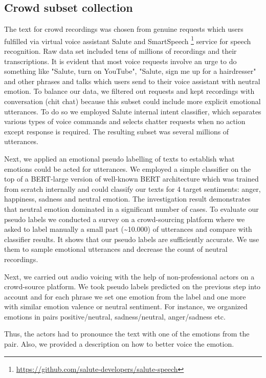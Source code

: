 \documentclass{article}
\begin{document}
\subsection{Crowd subset collection}
The text for crowd recordings was chosen from genuine requests which users fulfilled via virtual voice assistant Salute and SmartSpeech \footnote{\url{https://github.com/salute-developers/salute-speech}} service for speech recognition. 
Raw data set included tens of millions of recordings and their transcriptions. It is evident that most voice requests involve an urge to do something like "Salute, turn on YouTube", "Salute, sign me up for a hairdresser" and other phrases and talks which users send to their voice assistant with neutral emotion. To balance our data, we filtered out requests and kept recordings with conversation (chit chat) because this subset could include more explicit emotional utterances. To do so we employed Salute 
internal intent classifier, which separates various types of voice commands and selects chatter requests when no action except response is required. The resulting subset was several millions of utterances.

Next, we applied an emotional pseudo labelling of texts to establish what emotions could be acted for utterances. 
We employed a simple classifier on the top of a BERT-large version of well-known BERT architecture \cite{devlin2018bert} which was trained from scratch internally and could classify our texts for 4 target sentiments: anger, happiness, sadness and neutral emotion.
The investigation result demonstrates that neutral emotion dominated in a significant number of cases.
To evaluate our pseudo labels we conducted a survey on a crowd-sourcing platform where we asked to label manually a small part (\~{}10.000) of utterances and compare with classifier results. It shows that our pseudo labels are sufficiently accurate.
We use them to sample emotional utterances and decrease the count of neutral recordings.

Next, we carried out audio voicing with the help of non-professional actors on a crowd-source platform. We took pseudo labels predicted on the previous step into account and for each phrase we set one emotion from the label and one more with similar emotion valence or neutral sentiment. For instance, we organized emotions in pairs positive/neutral, sadness/neutral, anger/sadness etc.

Thus, the actors had to pronounce the text with one of the emotions from the pair. Also, we provided a description on how to better voice the emotion.
\end{document}
